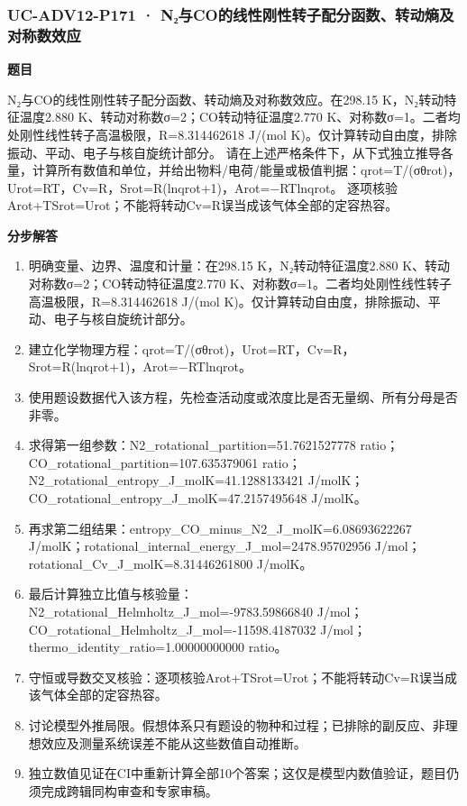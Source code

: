 \documentclass[UTF8,11pt,a4paper]{ctexart}
\begin{document}
\subsubsection*{UC-ADV12-P171 · N₂与CO的线性刚性转子配分函数、转动熵及对称数效应}
\noindent\textbf{题目}\par
N₂与CO的线性刚性转子配分函数、转动熵及对称数效应。在298.15 K，N₂转动特征温度2.880 K、转动对称数σ=2；CO转动特征温度2.770 K、对称数σ=1。二者均处刚性线性转子高温极限，R=8.314462618 J/(mol K)。仅计算转动自由度，排除振动、平动、电子与核自旋统计部分。 请在上述严格条件下，从下式独立推导各量，计算所有数值和单位，并给出物料/电荷/能量或极值判据：qrot=T/(σθrot)，Urot=RT，Cv=R，Srot=R(lnqrot+1)，Arot=−RTlnqrot。 逐项核验Arot+TSrot=Urot；不能将转动Cv=R误当成该气体全部的定容热容。\par
\medskip\noindent\textbf{分步解答}
\begin{enumerate}
\item 明确变量、边界、温度和计量：在298.15 K，N₂转动特征温度2.880 K、转动对称数σ=2；CO转动特征温度2.770 K、对称数σ=1。二者均处刚性线性转子高温极限，R=8.314462618 J/(mol K)。仅计算转动自由度，排除振动、平动、电子与核自旋统计部分。
\item 建立化学物理方程：qrot=T/(σθrot)，Urot=RT，Cv=R，Srot=R(lnqrot+1)，Arot=−RTlnqrot。
\item 使用题设数据代入该方程，先检查活动度或浓度比是否无量纲、所有分母是否非零。
\item 求得第一组参数：N2\_rotational\_partition=51.7621527778 ratio；CO\_rotational\_partition=107.635379061 ratio；N2\_rotational\_entropy\_J\_molK=41.1288133421 J/molK；CO\_rotational\_entropy\_J\_molK=47.2157495648 J/molK。
\item 再求第二组结果：entropy\_CO\_minus\_N2\_J\_molK=6.08693622267 J/molK；rotational\_internal\_energy\_J\_mol=2478.95702956 J/mol；rotational\_Cv\_J\_molK=8.31446261800 J/molK。
\item 最后计算独立比值与核验量：N2\_rotational\_Helmholtz\_J\_mol=-9783.59866840 J/mol；CO\_rotational\_Helmholtz\_J\_mol=-11598.4187032 J/mol；thermo\_identity\_ratio=1.00000000000 ratio。
\item 守恒或导数交叉核验：逐项核验Arot+TSrot=Urot；不能将转动Cv=R误当成该气体全部的定容热容。
\item 讨论模型外推局限。假想体系只有题设的物种和过程；已排除的副反应、非理想效应及测量系统误差不能从这些数值自动推断。
\item 独立数值见证在CI中重新计算全部10个答案；这仅是模型内数值验证，题目仍须完成跨辑同构审查和专家审稿。
\end{enumerate}
\end{document}
